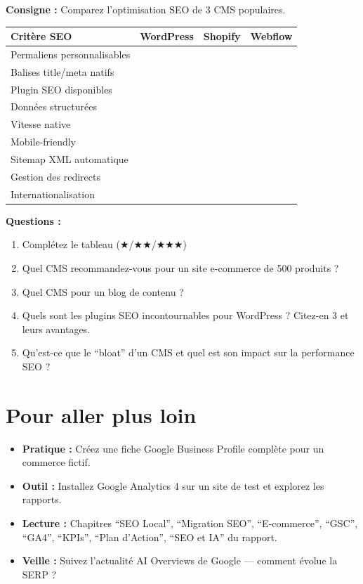 \documentclass[12pt,a4paper]{report}
\begin{document}
\textbf{Consigne :} Comparez l'optimisation SEO de 3 CMS populaires.

\begin{longtable}{lccc}
\toprule
Crit\`{e}re SEO & WordPress & Shopify & Webflow \\
\midrule
\endhead
\bottomrule
\endfoot
Permaliens personnalisables & & & \\
Balises title/meta natifs & & & \\
Plugin SEO disponibles & & & \\
Donn\'{e}es structur\'{e}es & & & \\
Vitesse native & & & \\
Mobile-friendly & & & \\
Sitemap XML automatique & & & \\
Gestion des redirects & & & \\
Internationalisation & & & \\
\bottomrule
\end{longtable}

\textbf{Questions :}
\begin{enumerate}
    \item Compl\'{e}tez le tableau ($\bigstar$/$\bigstar\bigstar$/$\bigstar\bigstar\bigstar$)
    \item Quel CMS recommandez-vous pour un site e-commerce de 500 produits ?
    \item Quel CMS pour un blog de contenu ?
    \item Quels sont les plugins SEO incontournables pour WordPress ? Citez-en 3 et leurs avantages.
    \item Qu'est-ce que le ``bloat'' d'un CMS et quel est son impact sur la performance SEO ?
\end{enumerate}

\section{Pour aller plus loin}

\begin{itemize}
    \item \textbf{Pratique :} Cr\'{e}ez une fiche Google Business Profile compl\`{e}te pour un commerce fictif.
    \item \textbf{Outil :} Installez Google Analytics 4 sur un site de test et explorez les rapports.
    \item \textbf{Lecture :} Chapitres ``SEO Local'', ``Migration SEO'', ``E-commerce'', ``GSC'', ``GA4'', ``KPIs'', ``Plan d'Action'', ``SEO et IA'' du rapport.
    \item \textbf{Veille :} Suivez l'actualit\'{e} AI Overviews de Google --- comment \'{e}volue la SERP ?
\end{itemize}
\end{document}

